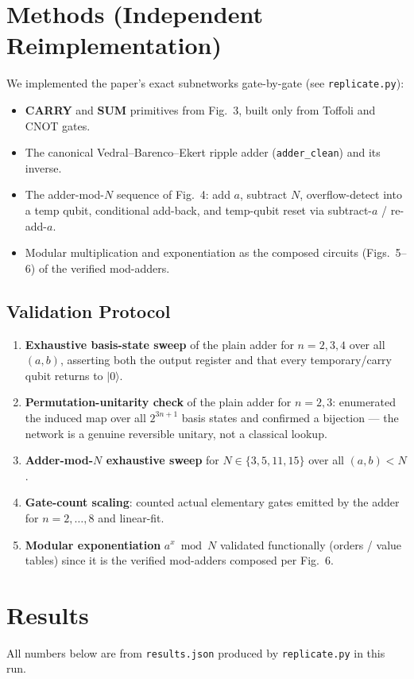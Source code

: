 \documentclass[11pt]{article}
\begin{document}
\section{Methods (Independent Reimplementation)}
We implemented the paper's exact subnetworks gate-by-gate (see
\texttt{replicate.py}):
\begin{itemize}
  \item \textbf{CARRY} and \textbf{SUM} primitives from Fig.~3, built only from
        Toffoli and CNOT gates.
  \item The canonical Vedral--Barenco--Ekert ripple adder
        (\texttt{adder\_clean}) and its inverse.
  \item The adder-mod-$N$ sequence of Fig.~4:
        add $a$, subtract $N$, overflow-detect into a temp qubit,
        conditional add-back, and temp-qubit reset via subtract-$a$ / re-add-$a$.
  \item Modular multiplication and exponentiation as the composed circuits
        (Figs.~5--6) of the verified mod-adders.
\end{itemize}

\subsection*{Validation Protocol}
\begin{enumerate}
  \item \textbf{Exhaustive basis-state sweep} of the plain adder for
        $n{=}2,3,4$ over all $(a,b)$, asserting both the output register and
        that every temporary/carry qubit returns to $|0\rangle$.
  \item \textbf{Permutation-unitarity check} of the plain adder for $n{=}2,3$:
        enumerated the induced map over all $2^{3n+1}$ basis states and
        confirmed a bijection --- the network is a genuine reversible unitary,
        not a classical lookup.
  \item \textbf{Adder-mod-$N$ exhaustive sweep} for $N \in \{3,5,11,15\}$ over
        all $(a,b) < N$.
  \item \textbf{Gate-count scaling}: counted actual elementary gates emitted by
        the adder for $n{=}2,\dots,8$ and linear-fit.
  \item \textbf{Modular exponentiation} $a^x \bmod N$ validated functionally
        (orders / value tables) since it is the verified mod-adders composed per
        Fig.~6.
\end{enumerate}

\section{Results}
All numbers below are from \texttt{results.json} produced by
\texttt{replicate.py} in this run.
\end{document}
